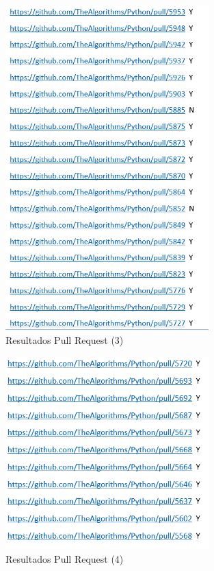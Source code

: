 \documentclass[a4paper, 12pt]{book}
\begin{document}
\begin{figure}
	\centering
    \includegraphics[width=0.7\textwidth]{img/git7}
    \caption{Resultados Pull Request (3)}
    \label{figura:git7}
 \end{figure}
 
\begin{figure}
	\centering
    \includegraphics[width=0.7\textwidth]{img/git8}
    \caption{Resultados Pull Request (4)}
    \label{figura:git8}
 \end{figure}
 
\end{document}
